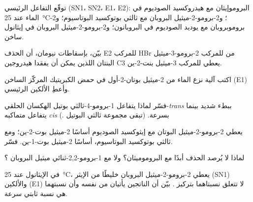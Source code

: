 \begin{exercise}[$\star$]\label{exo:b1:elimination:4}
توقّع التفاعل الرئيسي (SN1، SN2، E1، E2): البروموإيثان مع هيدروكسيد
الصوديوم في الماء عند \qty{25}{\celsius}؛ و2-برومو-2-ميثيل البروبان مع
ثالثي بوتوكسيد البوتاسيوم؛ و2-بروموبروبان مع يوديد الصوديوم في البروبانون؛
و2-برومو-2-ميثيل البروبان في إيثانول ساخن.
\end{exercise}

\begin{exercise}[$\star\star$]\label{exo:b1:elimination:5}
بيّن، بإسقاطات نيومان، أن الحذف E2 للمركب HBr من
 للمركب 2-برومو-3-ميثيل البنتان اللذين يمكن أن يفقدا هيدروجين C3
يعطي  للمركب 3-ميثيل بنت-2-ين.
\end{exercise}

\begin{exercise}[$\star\star$]\label{exo:b1:elimination:6}
اكتب آلية نزع الماء من 2-ميثيل بوتان-2-أول في حمض الكبريتيك
المركّز الساخن (E1) وأعطِ الألكين الرئيسي.
\end{exercise}

\begin{exercise}[$\star\star$]\label{exo:b1:elimination:7}
فسّر لماذا يتفاعل 1-برومو-4-ثالثي بوتيل الهكسان الحلقي-\textit{trans} ببطء
شديد  بينما يتفاعل متماكبه \textit{cis} بسرعة. (تبقى مجموعة ثالثي البوتيل
.)
\end{exercise}

\begin{exercise}[$\star\star$]\label{exo:b1:elimination:8}
يعطي 2-برومو-2-ميثيل البوتان مع إيثوكسيد الصوديوم أساسًا
2-ميثيل بوت-2-ين؛ ومع ثالثي بوتوكسيد البوتاسيوم، أساسًا
2-ميثيل بوت-1-ين. فسّر.
\end{exercise}

\begin{exercise}[$\star\star$]\label{exo:b1:elimination:9}
لماذا لا يُرصد الحذف أبدًا مع البروموميثان؟ ولا مع
1-برومو-2,2-ثنائي ميثيل البروبان ؟
\end{exercise}

\begin{exercise}[$\star\star\star$]\label{exo:b1:elimination:10}
في الإيثانول عند \qty{25}{\celsius}، يعطي 2-برومو-2-ميثيل البروبان خليطًا
من الإيثر (SN1) والألكين (E1) لا تتعلق نسبتاهما
بتركيز . بيّن أن الناتجين يأتيان من
 نفسه وأن نسبتهما هي نسبة ثابتي
سرعة.
\end{exercise}

